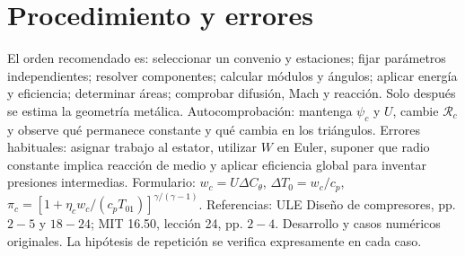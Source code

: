 \documentclass[10pt,openany]{book}
\begin{document}
\section{Procedimiento y errores}

El orden recomendado es: seleccionar un convenio y estaciones; fijar parámetros independientes; resolver componentes; calcular módulos y ángulos; aplicar energía y eficiencia; determinar áreas; comprobar difusión, Mach y reacción. Solo después se estima la geometría metálica. Autocomprobación: mantenga \(\psi_c\) y \(U\), cambie \(\mathcal R_c\) y observe qué permanece constante y qué cambia en los triángulos.
Errores habituales: asignar trabajo al estator, utilizar \(W\) en Euler, suponer que radio constante implica reacción de medio y aplicar eficiencia global para inventar presiones intermedias. Formulario: \(w_c=U\Delta C_\theta\), \(\Delta T_0=w_c/c_p\), \(\pi_c=[1+\eta_cw_c/(c_pT_{01})]^{\gamma/(\gamma-1)}\).
Referencias: ULE Diseño de compresores, pp. \(2-5\) y \(18-24\); MIT 16.50, lección 24, pp. \(2-4\). Desarrollo y casos numéricos originales. La hipótesis de repetición se verifica expresamente en cada caso.
\end{document}
